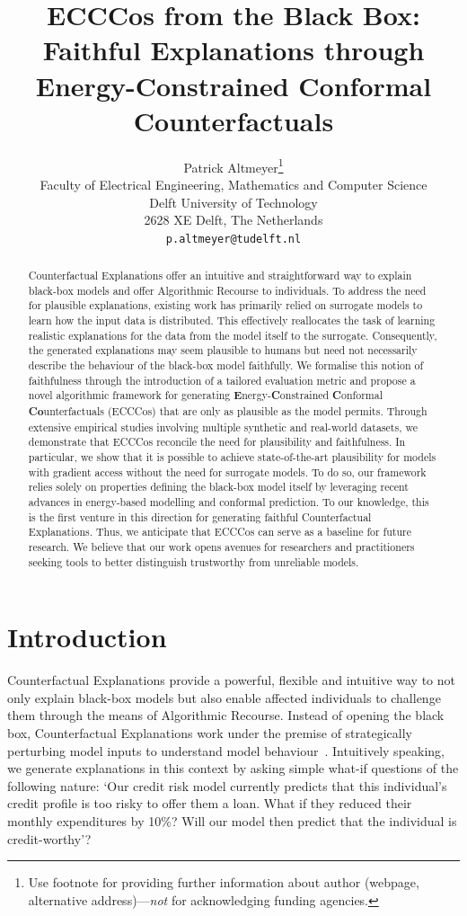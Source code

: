 \documentclass{article}
\title{ECCCos from the Black Box:\\
Faithful Explanations through\\
Energy-Constrained Conformal Counterfactuals}
\author{%
  Patrick Altmeyer\thanks{Use footnote for providing further information
    about author (webpage, alternative address)---\emph{not} for acknowledging
    funding agencies.} \\
  Faculty of Electrical Engineering, Mathematics and Computer Science\\
  Delft University of Technology\\
  2628 XE Delft, The Netherlands \\
  \texttt{p.altmeyer@tudelft.nl} \\
}
\begin{document}
\maketitle


\begin{abstract}
  Counterfactual Explanations offer an intuitive and straightforward way to explain black-box models and offer Algorithmic Recourse to individuals. To address the need for plausible explanations, existing work has primarily relied on surrogate models to learn how the input data is distributed. This effectively reallocates the task of learning realistic explanations for the data from the model itself to the surrogate. Consequently, the generated explanations may seem plausible to humans but need not necessarily describe the behaviour of the black-box model faithfully. We formalise this notion of faithfulness through the introduction of a tailored evaluation metric and propose a novel algorithmic framework for generating \textbf{E}nergy-\textbf{C}onstrained \textbf{C}onformal \textbf{Co}unterfactuals (ECCCos) that are only as plausible as the model permits. Through extensive empirical studies involving multiple synthetic and real-world datasets, we demonstrate that ECCCos reconcile the need for plausibility and faithfulness. In particular, we show that it is possible to achieve state-of-the-art plausibility for models with gradient access without the need for surrogate models. To do so, our framework relies solely on properties defining the black-box model itself by leveraging recent advances in energy-based modelling and conformal prediction. To our knowledge, this is the first venture in this direction for generating faithful Counterfactual Explanations. Thus, we anticipate that ECCCos can serve as a baseline for future research. We believe that our work opens avenues for researchers and practitioners seeking tools to better distinguish trustworthy from unreliable models.
\end{abstract}

\section{Introduction}\label{intro}

Counterfactual Explanations provide a powerful, flexible and intuitive way to not only explain black-box models but also enable affected individuals to challenge them through the means of Algorithmic Recourse. Instead of opening the black box, Counterfactual Explanations work under the premise of strategically perturbing model inputs to understand model behaviour~\citep{wachter2017counterfactual}. Intuitively speaking, we generate explanations in this context by asking simple what-if questions of the following nature: `Our credit risk model currently predicts that this individual's credit profile is too risky to offer them a loan. What if they reduced their monthly expenditures by 10\%? Will our model then predict that the individual is credit-worthy'? 
\end{document}
